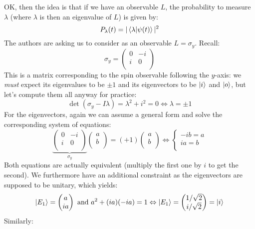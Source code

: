 \documentclass[solutions.tex]{subfiles}
\begin{document}
OK, then the idea is that if we have an observable $L$, the probability
to measure $\lambda$ (where $\lambda$ is then an eigenvalue of $L$) is
given by:
\[
	P_\lambda(t) = |\left\langle \lambda \middle| \psi(t) \right\rangle|^2
\]
The authors are asking us to consider as an observable $L=\sigma_y$. Recall:
\[
	\sigma_y = \begin{pmatrix}
		0 & -i \\
		i & 0  \\
	\end{pmatrix}
\]
This is a matrix corresponding to the spin observable following the $y$-axis:
we \textit{must} expect its eigenvalues to be $\pm 1$ and its eigenvectors
to be $|i\rangle$ and $|o\rangle$, but let's compute them all anyway for practice:
\[
	\det(\sigma_y-I\lambda) = \lambda^2+i^2 = 0
	\Leftrightarrow \lambda = \pm 1
\]
For the eigenvectors, again we can assume a general form and solve
the corresponding system of equations:
\[
	\underbrace{\begin{pmatrix}
		0 & -i \\
		i &  0 \\
	\end{pmatrix}}_{\sigma_y} \begin{pmatrix} a \\ b \\ \end{pmatrix}
		= (+1)\begin{pmatrix} a \\ b \\ \end{pmatrix}
	\Leftrightarrow \begin{cases}
		-ib = a \\
		ia = b \\
	\end{cases}
\]
Both equations are actually equivalent (multiply the first one by $i$
to get the second). We furthermore have an additional constraint as
the eigenvectors are supposed to be unitary, which yields:
\[
	|E_1\rangle = \begin{pmatrix}
		a \\
		ia \\
	\end{pmatrix} \text{ and } a^2+(ia)(-ia) = 1
	\Leftrightarrow
	|E_1\rangle = \begin{pmatrix}
		1/\sqrt2 \\
		i/\sqrt2 \\
	\end{pmatrix} = |i\rangle
\]
Similarly:
\end{document}

